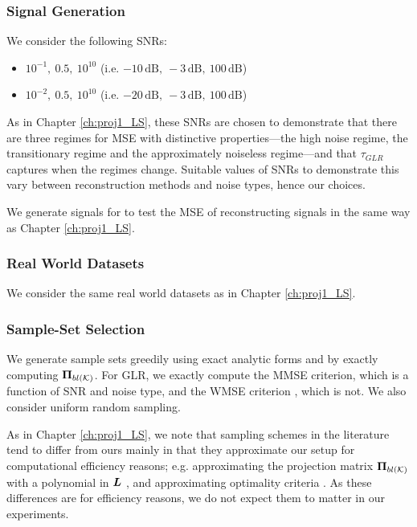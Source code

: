 \subsubsection{ Signal Generation}
We consider the following SNRs:

\begin{itemize}
    \item {} $10^{-1},\ 0.5,\ 10^{10}$ (i.e. $-10\,\mathrm{dB},\ -3\,\mathrm{dB},\ 100\,\mathrm{dB}$)
    \item {} $10^{-2},\ 0.5,\ 10^{10}$ (i.e. $-20\,\mathrm{dB},\ -3\,\mathrm{dB},\ 100\,\mathrm{dB}$)
\end{itemize}

As in Chapter \ref{ch:proj1_LS}, these SNRs are chosen to demonstrate that there are three regimes for MSE with distinctive properties---the high noise regime, the transitionary regime and the approximately noiseless regime---and that $\tau_{GLR}$ captures when the regimes change. Suitable values of SNRs to demonstrate this vary between reconstruction methods and noise types, hence our choices.

We generate signals for to test the MSE of reconstructing signals in the same way as Chapter \ref{ch:proj1_LS}.

\subsubsection{Real World Datasets}
We consider the same real world datasets as in Chapter \ref{ch:proj1_LS}.

\subsubsection{Sample-Set Selection}

We generate sample sets greedily using exact analytic forms and by exactly computing $\bm{\Pi}_{bl(\mathcal{K})}$.
For GLR, we exactly compute the MMSE criterion, which is a function of SNR and noise type, and the WMSE criterion {\color{black}\cite{EOptimalChen}}, which is not. We also consider uniform random sampling.

As in Chapter \ref{ch:proj1_LS}, we note that sampling schemes in the literature tend to differ from ours mainly in that they approximate our setup for computational efficiency reasons; e.g. approximating the projection matrix $\projbl$ with a polynomial in $\bm{L}$ \cite{wang2018optimal}, and approximating optimality criteria \cite{bai2020fast}. As these differences are for efficiency reasons, we do not expect them to matter in our experiments.

